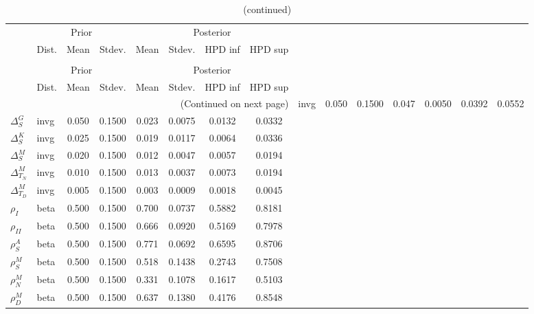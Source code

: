  
\begin{center}
\begin{longtable}{llcccccc} 
\caption{Results from Metropolis-Hastings (parameters)}
 \label{Table:MHPosterior:1}\\
\toprule 
  & \multicolumn{3}{c}{Prior}  &  \multicolumn{4}{c}{Posterior} \\
  \cmidrule(r{.75em}){2-4} \cmidrule(r{.75em}){5-8}
  & Dist. & Mean  & Stdev. & Mean & Stdev. & HPD inf & HPD sup\\
\midrule \endfirsthead 
\caption{(continued)}\\\toprule 
  & \multicolumn{3}{c}{Prior}  &  \multicolumn{4}{c}{Posterior} \\
  \cmidrule(r{.75em}){2-4} \cmidrule(r{.75em}){5-8}
  & Dist. & Mean  & Stdev. & Mean & Stdev. & HPD inf & HPD sup\\
\midrule \endhead 
\bottomrule \multicolumn{8}{r}{(Continued on next page)} \endfoot 
\bottomrule \endlastfoot 
${\Delta^{A}_{S}}$ & invg &   0.050 & 0.1500 &   0.047& 0.0050 &  0.0392 &  0.0552 \\ 
${\Delta^{G}_{S}}$ & invg &   0.050 & 0.1500 &   0.023& 0.0075 &  0.0132 &  0.0332 \\ 
${\Delta^{K}_{S}}$ & invg &   0.025 & 0.1500 &   0.019& 0.0117 &  0.0064 &  0.0336 \\ 
${\Delta^{M}_{S}}$ & invg &   0.020 & 0.1500 &   0.012& 0.0047 &  0.0057 &  0.0194 \\ 
${\Delta^{M}_{T_N}}$ & invg &   0.010 & 0.1500 &   0.013& 0.0037 &  0.0073 &  0.0194 \\ 
${\Delta^{M}_{T_D}}$ & invg &   0.005 & 0.1500 &   0.003& 0.0009 &  0.0018 &  0.0045 \\ 
${\rho_{I}}$ & beta &   0.500 & 0.1500 &   0.700& 0.0737 &  0.5882 &  0.8181 \\ 
${\rho_{II}}$ & beta &   0.500 & 0.1500 &   0.666& 0.0920 &  0.5169 &  0.7978 \\ 
${\rho^{A}_{S}}$ & beta &   0.500 & 0.1500 &   0.771& 0.0692 &  0.6595 &  0.8706 \\ 
${\rho^{M}_{S}}$ & beta &   0.500 & 0.1500 &   0.518& 0.1438 &  0.2743 &  0.7508 \\ 
${\rho^{M}_{N}}$ & beta &   0.500 & 0.1500 &   0.331& 0.1078 &  0.1617 &  0.5103 \\ 
${\rho^{M}_{D}}$ & beta &   0.500 & 0.1500 &   0.637& 0.1380 &  0.4176 &  0.8548 \\ 
\end{longtable}
 \end{center}
